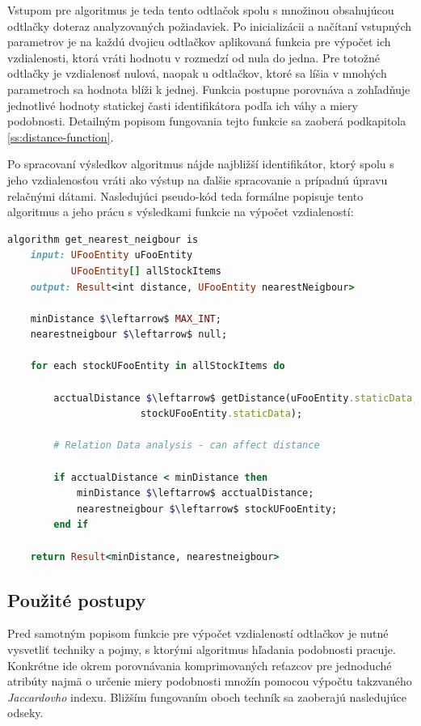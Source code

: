 \documentclass[
  digital, %
  oneside, %
  table,   %
  lof,     %
  nolot,   %
  nocover
]{fithesis3}
\begin{document}
Vstupom pre algoritmus je teda tento odtlačok
spolu s množinou obsahujúcou odtlačky doteraz analyzovaných požiadaviek.
Po
inicializácii a načítaní vstupných parametrov je na každú dvojicu odtlačkov
aplikovaná funkcia pre výpočet ich vzdialenosti, ktorá vráti hodnotu v rozmedzí
od nula do jedna. Pre totožné odtlačky je vzdialenosť nulová, naopak u
odtlačkov, ktoré sa líšia v mnohých parametroch sa hodnota blíži k jednej.
Funkcia postupne porovnáva a zohľadňuje jednotlivé hodnoty statickej časti
identifikátora podľa ich váhy a miery podobnosti. Detailným popisom fungovania
tejto funkcie sa zaoberá podkapitola \ref{ss:distance-function}. 

Po spracovaní
výsledkov algoritmus nájde najbližší identifikátor, ktorý spolu s jeho
vzdialenosťou vráti ako výstup na ďalšie spracovanie a prípadnú úpravu
relačnými dátami.
Nasledujúci pseudo-kód teda formálne popisuje tento algoritmus a jeho prácu s
výsledkami funkcie na výpočet vzdialeností:
\begin{lstlisting}[basicstyle=\footnotesize, language=Ruby, mathescape]
algorithm get_nearest_neigbour is
    input: UFooEntity uFooEntity
           UFooEntity[] allStockItems
    output: Result<int distance, UFooEntity nearestNeigbour>

    minDistance $\leftarrow$ MAX_INT;
    nearestneigbour $\leftarrow$ null;

    for each stockUFooEntity in allStockItems do

        acctualDistance $\leftarrow$ getDistance(uFooEntity.staticData,
                       stockUFooEntity.staticData);

        # Relation Data analysis - can affect distance 

        if acctualDistance < minDistance then
            minDistance $\leftarrow$ acctualDistance;
            nearestneigbour $\leftarrow$ stockUFooEntity;
        end if
    
    return Result<minDistance, nearestneigbour>
\end{lstlisting}

\subsection{Použité postupy}
Pred samotným popisom funkcie pre výpočet vzdialeností odtlačkov je nutné
vysvetliť techniky a pojmy, s ktorými algoritmus hľadania podobnosti pracuje. 
Konkrétne ide
okrem porovnávania komprimovaných reťazcov pre jednoduché atribúty najmä o 
určenie miery podobnosti množín pomocou výpočtu takzvaného
\textit{Jaccardovho} indexu. Bližším fungovaním oboch techník sa zaoberajú nasledujúce odseky.
\end{document}
